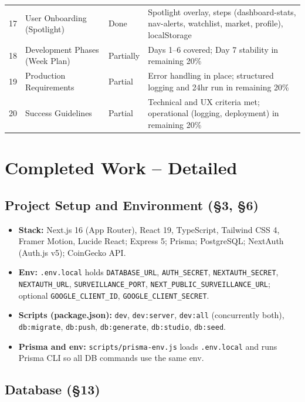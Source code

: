 \documentclass[11pt,a4paper]{report}
\begin{document}
\begin{longtable}{@{}p{1.2em} p{4.2cm} p{1.8cm} p{5.8cm}@{}}
  17 & User Onboarding (Spotlight) & Done & Spotlight overlay, steps (dashboard-stats, nav-alerts, watchlist, market, profile), localStorage \\
  18 & Development Phases (Week Plan) & Partially & Days 1--6 covered; Day 7 stability in remaining 20\% \\
  19 & Production Requirements & Partial & Error handling in place; structured logging and 24hr run in remaining 20\% \\
  20 & Success Guidelines & Partial & Technical and UX criteria met; operational (logging, deployment) in remaining 20\% \\
\end{longtable}
\label{tab:coverage}

\chapter{Completed Work -- Detailed}

\section{Project Setup and Environment (\S3, \S6)}

\begin{itemize}[leftmargin=*]
  \item \textbf{Stack:} Next.js 16 (App Router), React 19, TypeScript, Tailwind CSS 4, Framer Motion, Lucide React; Express 5; Prisma; PostgreSQL; NextAuth (Auth.js v5); CoinGecko API.
  \item \textbf{Env:} \texttt{.env.local} holds \texttt{DATABASE\_URL}, \texttt{AUTH\_SECRET}, \texttt{NEXTAUTH\_SECRET}, \texttt{NEXTAUTH\_URL}, \texttt{SURVEILLANCE\_PORT}, \texttt{NEXT\_PUBLIC\_SURVEILLANCE\_URL}; optional \texttt{GOOGLE\_CLIENT\_ID}, \texttt{GOOGLE\_CLIENT\_SECRET}.
  \item \textbf{Scripts (package.json):} \texttt{dev}, \texttt{dev:server}, \texttt{dev:all} (concurrently both), \texttt{db:migrate}, \texttt{db:push}, \texttt{db:generate}, \texttt{db:studio}, \texttt{db:seed}.
  \item \textbf{Prisma and env:} \texttt{scripts/prisma-env.js} loads \texttt{.env.local} and runs Prisma CLI so all DB commands use the same env.
\end{itemize}

\section{Database (\S13)}
\end{document}

